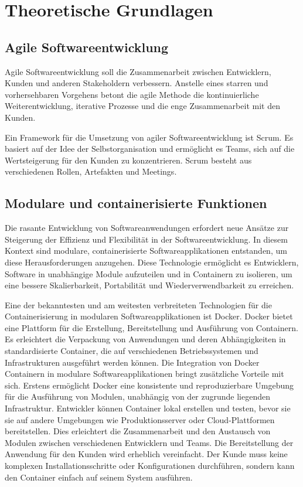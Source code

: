 \chapter{Theoretische Grundlagen}

\section{Agile Softwareentwicklung}
Agile Softwareentwicklung soll die Zusammenarbeit zwischen Entwicklern, Kunden und anderen Stakeholdern verbessern. Anstelle 
eines starren und vorhersehbaren Vorgehens betont die agile Methode die kontinuierliche Weiterentwicklung, iterative Prozesse 
und die enge Zusammenarbeit mit den Kunden.

Ein Framework für die Umsetzung von agiler Softwareentwicklung ist Scrum. Es basiert auf der Idee der Selbstorganisation und ermöglicht es Teams, sich auf die Wertsteigerung für den Kunden zu konzentrieren. Scrum besteht aus verschiedenen Rollen, Artefakten und Meetings.


\section{Modulare und containerisierte Funktionen}
Die rasante Entwicklung von Softwareanwendungen erfordert neue Ansätze zur Steigerung der Effizienz und Flexibilität in der Softwareentwicklung. 
In diesem Kontext sind modulare, containerisierte Softwareapplikationen entstanden, um diese Herausforderungen anzugehen. 
Diese Technologie ermöglicht es Entwicklern, Software in unabhängige Module aufzuteilen und in Containern zu isolieren, um 
eine bessere Skalierbarkeit, Portabilität und Wiederverwendbarkeit zu erreichen.

Eine der bekanntesten und am weitesten verbreiteten Technologien für die Containerisierung in modularen Softwareapplikationen ist Docker. Docker bietet eine Plattform für die Erstellung, Bereitstellung und Ausführung von Containern. Es erleichtert die Verpackung von Anwendungen und deren Abhängigkeiten in standardisierte Container, die auf verschiedenen Betriebssystemen und Infrastrukturen ausgeführt werden können.
Die Integration von Docker Containern in modulare Softwareapplikationen bringt zusätzliche Vorteile mit sich. Erstens ermöglicht Docker eine konsistente und reproduzierbare Umgebung für die Ausführung von Modulen, unabhängig von der zugrunde liegenden Infrastruktur. Entwickler können Container lokal erstellen und testen, bevor sie sie auf andere Umgebungen wie Produktionsserver oder Cloud-Plattformen bereitstellen. Dies erleichtert die Zusammenarbeit und den Austausch von Modulen zwischen verschiedenen Entwicklern und Teams.
Die Bereitstellung der Anwendung für den Kunden wird erheblich vereinfacht. Der Kunde muss keine komplexen Installationsschritte oder Konfigurationen durchführen, sondern kann den Container einfach auf seinem System ausführen.

